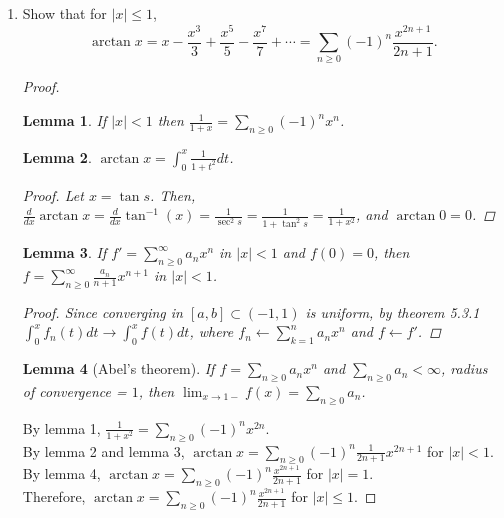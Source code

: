\documentclass{article}
\newtheorem{lemma}{Lemma}
\begin{document}
\begin{enumerate}[font = \Large\bfseries\itshape\space, leftmargin = 3mm, labelsep = 3mm]
\item
Show that for $|x| \leq 1$,
$$\arctan x = x - \frac{x^3}{3} + \frac{x^5}{5} - \frac{x^7}{7} + \cdots = \sum_{n\geq 0}(-1)^n \frac{x^{2n+1}}{2n+1}.$$
\begin{proof}
\begin{lemma}
If $|x| < 1$ then $\frac{1}{1+x} = \sum_{n\geq 0} (-1)^n x^{n}$.
\end{lemma}

\begin{lemma}
$\arctan x = \int_0^x \frac{1}{1+t^2}dt$.
\begin{proof}
Let $x = \tan s$. Then,
$\frac{d}{dx} \arctan x = \frac{d}{dx} \tan^{-1}(x) = \frac{1}{\sec^2s} = \frac{1}{1+\tan^2 s} = \frac{1}{1+x^2}$, and $\arctan 0 = 0$.
\end{proof}
\end{lemma}

\begin{lemma}
If $f' = \sum_{n\geq 0}^\infty a_nx^n$ in $|x| < 1$ and $f(0) = 0$, then $f = \sum_{n\geq 0}^\infty \frac{a_n}{n+1}x^{n+1}$ in $|x| < 1$.
\begin{proof}
Since converging in $[a,b] \subset (-1,1)$ is uniform, by theorem 5.3.1 $\int_0^x f_n(t) dt \rightarrow \int_0^x f(t)dt$, where $f_n \leftarrow \sum_{k=1}^n a_nx^n$ and $f \leftarrow f'$.
\end{proof}
\end{lemma}

\begin{lemma}[Abel's theorem]
If $f = \sum_{n\geq 0} a_nx^n$ and $\sum_{n\geq 0} a_n <\infty$, radius of convergence = $1$, then $\lim_{x\rightarrow 1-}f(x) = \sum_{n\geq 0} a_n$.
\end{lemma}

By lemma 1, $\frac{1}{1+x^2} = \sum_{n\geq 0} (-1)^n x^{2n}$.\\
By lemma 2 and lemma 3, $\arctan x = \sum_{n\geq 0} (-1)^n \frac{1}{2n+1} x^{2n+1}$ for $|x| < 1$.\\
By lemma 4, $\arctan x = \sum_{n\geq 0} (-1)^n \frac{x^{2n+1}}{2n+1}$ for $|x| = 1$.\\
Therefore, $\arctan x = \sum_{n\geq 0} (-1)^n \frac{x^{2n+1}}{2n+1}$ for $|x| \leq 1$.
\end{proof}



\end{enumerate}
\end{document}
